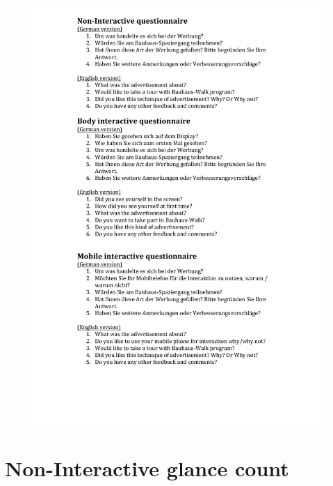 \begin{appendices}
\begin{figure}[H]
 \centering 
    \includegraphics[width=\textwidth,height=0.8\textheight]{Appendices/8/whole_week_interivew.pdf}
     \label{app:whole_interview}%
\end{figure}


\section{Non-Interactive glance count}


\end{appendices}
